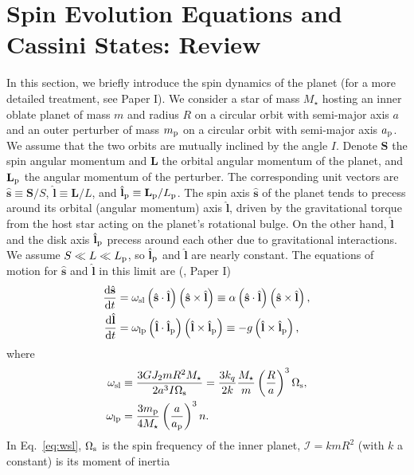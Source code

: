 \documentclass[
        fleqn,
        usenatbib,
        referee,
    ]{mnras}
\newcommand*{\rd}[2]{\frac{\mathrm{d}#1}{\mathrm{d}#2}}
\newcommand*{\p}[1]{\left(#1\right)}
\newcommand*{\bm}[1]{\mathbf{#1}}
\newcommand*{\uv}[1]{\hat{\boldsymbol{\mathbf{#1}}}}
\begin{document}
\section{Spin Evolution Equations and Cassini States: Review}\label{s:theory}

In this section, we briefly introduce the spin dynamics of the planet (for a
more detailed treatment, see Paper I). We consider a star of mass $M_\star$
hosting an inner oblate planet of mass $m$ and radius $R$ on a circular orbit
with semi-major axis $a$ and an outer perturber of mass $m_{\rm p}$ on a
circular orbit with semi-major axis $a_{\rm p}$. We assume that the two orbits
are mutually inclined by the angle $I$. Denote $\bm{S}$ the spin angular
momentum and $\bm{L}$ the orbital angular momentum of the planet, and
$\bm{L}_{\rm p}$ the angular momentum of the perturber. The corresponding unit
vectors are $\uv{s} \equiv \bm{S} / S$, $\uv{l} \equiv \bm{L} / L$, and
$\uv{l}_{\rm p} \equiv \bm{L}_{\rm p} / L_{\rm p}$. The spin axis $\uv{s}$ of
the planet tends to precess around its orbital (angular momentum) axis $\uv{l}$,
driven by the gravitational torque from the host star acting on the planet's
rotational bulge. On the other hand, $\uv{l}$ and the disk axis $\uv{l}_{\rm p}$
precess around each other due to gravitational interactions. We assume $S \ll L
\ll L_{\rm p}$, so $\uv{l}_{\rm p}$ and $\uv{l}$ are nearly constant. The
equations of motion for $\uv{s}$ and $\uv{l}$ in this limit are
(\citealp{anderson2018teeter}, Paper I)
\begin{align}
    \rd{\uv{s}}{t}
        &= \omega_{\rm sl}\p{\uv{s} \cdot \uv{l}}\p{\uv{s} \times \uv{l}}
        \equiv \alpha\p{\uv{s} \cdot \uv{l}}\p{\uv{s} \times
        \uv{l}},\label{eq:dsdt1}\\
    \rd{\uv{l}}{t} &= \omega_{\rm lp}\p{\uv{l} \cdot \uv{l}_{\rm p}}\p{\uv{l}
        \times \uv{l}_{\rm p}} \equiv -g\p{\uv{l} \times \uv{l}_{\rm p}},
        \label{eq:dldt1}
\end{align}
where
\begin{align}
    \omega_{\rm sl} &\equiv \frac{3GJ_2 mR^2 M_\star}{2a^3 I\Omega_{\rm s}}
        = \frac{3k_q}{2k}\frac{M_\star}{m}\p{\frac{R}{a}}^3 \Omega_{\rm s},
            \label{eq:wsl}\\
    \omega_{\rm lp} &= \frac{3m_{\rm p}}{4M_\star}\p{\frac{a}{a_{\rm p}}}^3
        n.\label{eq:wlp}
\end{align}
In Eq.~\eqref{eq:wsl}, $\Omega_{\rm s}$ is the spin frequency of the inner
planet, $\mathcal{I} = k mR^2$ (with $k$ a constant) is its moment of inertia
\end{document}
